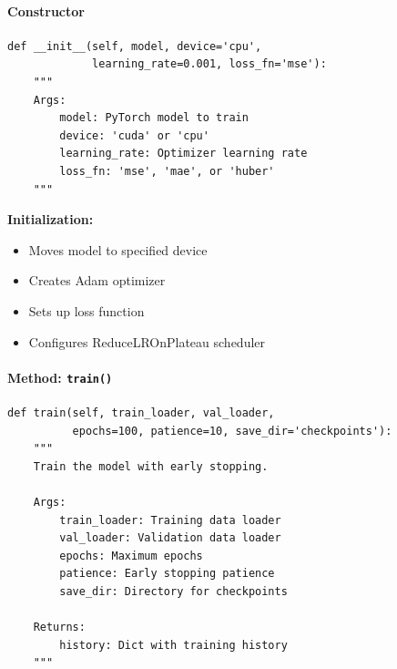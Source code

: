 \documentclass[11pt,a4paper]{article}
\begin{document}
\paragraph{Constructor}
\begin{lstlisting}
def __init__(self, model, device='cpu',
             learning_rate=0.001, loss_fn='mse'):
    """
    Args:
        model: PyTorch model to train
        device: 'cuda' or 'cpu'
        learning_rate: Optimizer learning rate
        loss_fn: 'mse', 'mae', or 'huber'
    """
\end{lstlisting}

\textbf{Initialization:}
\begin{itemize}
    \item Moves model to specified device
    \item Creates Adam optimizer
    \item Sets up loss function
    \item Configures ReduceLROnPlateau scheduler
\end{itemize}

\paragraph{Method: \texttt{train()}}
\begin{lstlisting}
def train(self, train_loader, val_loader,
          epochs=100, patience=10, save_dir='checkpoints'):
    """
    Train the model with early stopping.

    Args:
        train_loader: Training data loader
        val_loader: Validation data loader
        epochs: Maximum epochs
        patience: Early stopping patience
        save_dir: Directory for checkpoints

    Returns:
        history: Dict with training history
    """
\end{lstlisting}
\end{document}
